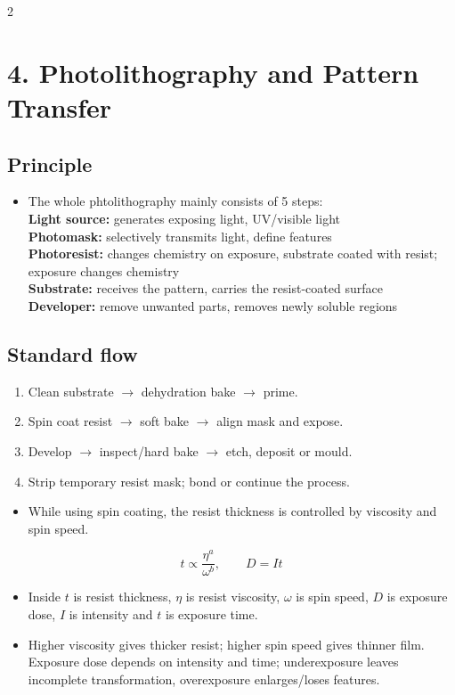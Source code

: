 \documentclass[10pt,a4paper]{ctexart}
\newcommand{\key}[1]{\textbf{#1}}
\newcommand{\formula}[1]{%
	\par\vspace{1pt}\begingroup
	\setlength{\abovedisplayskip}{0pt}\setlength{\belowdisplayskip}{0pt}
	\[ #1 \]\endgroup\vspace{1pt}}
\begin{document}
\begin{multicols*}{2}
\section{4. Photolithography and Pattern Transfer}
\subsection{Principle}
\begin{itemize}
	\item The whole phtolithography mainly consists of 5 steps:\\
	\key{Light source:} generates exposing light, UV/visible light\\
	\key{Photomask:} selectively transmits light, define features\\
	\key{Photoresist:} changes chemistry on exposure, substrate coated with resist; exposure changes chemistry\\
	\key{Substrate:} receives the pattern, carries the resist-coated surface\\
	\key{Developer:} remove unwanted parts, removes newly soluble regions
\end{itemize}
\subsection{Standard flow}
\begin{enumerate}
	\item Clean substrate \(\rightarrow\) dehydration bake \(\rightarrow\) prime.
	\item Spin coat resist \(\rightarrow\) soft bake \(\rightarrow\) align mask and expose.
	\item Develop \(\rightarrow\) inspect/hard bake \(\rightarrow\) etch, deposit or mould.
	\item Strip temporary resist mask; bond or continue the process.
\end{enumerate}
\begin{itemize}
	\item While using spin coating, the resist thickness is controlled by viscosity and spin speed.
\end{itemize}
\formula{t\propto\frac{\eta^a}{\omega^b},\qquad D=It}
\begin{itemize}
	\item Inside \(t\) is resist thickness, \(\eta\) is resist viscosity, \(\omega\) is spin speed, 
	\(D\) is exposure dose, \(I\) is intensity and \(t\) is exposure time.
	\item Higher viscosity gives thicker resist; higher spin speed gives thinner film. 
	Exposure dose depends on intensity and time; 
	underexposure leaves incomplete transformation, overexposure enlarges/loses features.
\end{itemize}


\end{multicols*}
\end{document}
